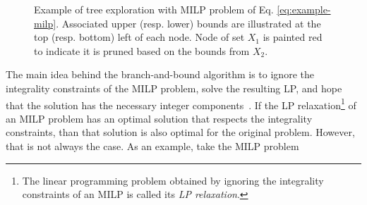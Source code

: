 \begin{figure}[h]
    \centering
    \caption{Example of tree exploration with MILP problem of Eq. \eqref{eq:example-milp}. Associated upper (resp. lower) bounds are illustrated at the top (resp. bottom) left of each node. Node of set $X_1$ is painted red to indicate it is pruned based on the bounds from $X_2$.}
    \label{fig:pruning-example-milp}
\end{figure}









The main idea behind the branch-and-bound algorithm is to ignore the integrality constraints of the MILP problem, solve the resulting LP, and hope that the solution has the necessary integer components~\cite{vanderbeiLinearProgrammingFoundations1998}.
If the LP relaxation\footnote{The linear programming problem obtained by ignoring the integrality constraints of an MILP is called its \emph{LP relaxation}.} of an MILP problem has an optimal solution that respects the integrality constraints, than that solution is also optimal for the original problem.
However, that is not always the case.
As an example, take the MILP problem

